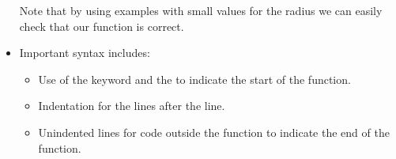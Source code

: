 \documentclass[letterpaper,10pt,english]{sphinxmanual}
\begin{document}
\begin{itemize}
Note that by using examples with small values for the radius we can
easily check that our function is correct.

\item {} 
Important syntax includes:
\begin{itemize}
\item {} 
Use of the keyword  and the \sphinxcode{\sphinxupquote{:}} to indicate the start of
the function.

\item {} 
Indentation for the lines after the  line.

\item {} 
Unindented lines for code outside the function to indicate the end of the function.

\end{itemize}

\end{itemize}
\end{document}
